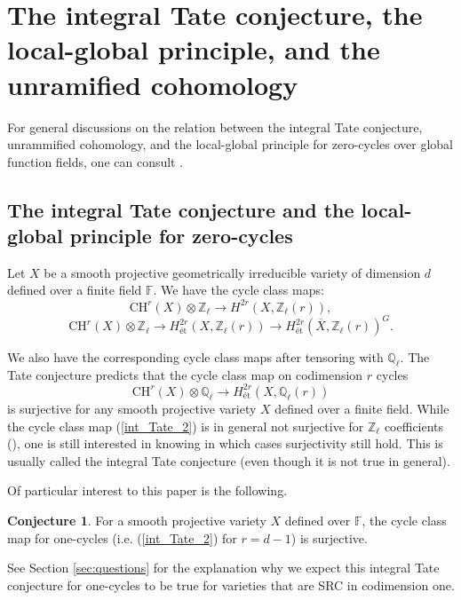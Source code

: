 \documentclass{amsart}
\theoremstyle{definition}
\newtheorem{conj}[theorem]{Conjecture}
\theoremstyle{remark}
\newcommand{\mbb}{\mathbb}
\newcommand{\FF}{\mbb{F}}
\newcommand{\QQ}{\mbb{Q}}
\newcommand{\ZZ}{\mbb{Z}}
\begin{document}

\section{The integral Tate conjecture, the local-global principle, and the unramified cohomology}\label{sec:ITateHasse}

For general discussions on the relation between the integral Tate conjecture, unrammified cohomology, and the local-global principle for zero-cycles over global function fields, one can consult \cite{CTKahnCycleCodim2,CT_Scavia_ITC}.
\subsection{The integral Tate conjecture and the local-global principle for zero-cycles}
Let $X$ be a smooth projective geometrically irreducible variety of dimension $d$ defined over a finite field $\FF$. We have the cycle class maps:
\begin{equation}\label{int_Tate_2}
\text{CH}^r(X) \otimes \ZZ_\ell \to H^{2r}(X, \ZZ_\ell(r)),
\end{equation}
\[
\text{CH}^r(X) \otimes \ZZ_\ell \to H^{2r}_{\text{{\'e}t}}(X, \ZZ_\ell(r)) \to H^{2r}_{\text{{\'e}t}}(\overline{X}, \ZZ_\ell(r))^G.
\]

We also have the corresponding cycle class maps after tensoring with $\QQ_\ell$.
The Tate conjecture predicts that the cycle class map on codimension $r$ cycles
\[
\text{CH}^r(X) \otimes \mathbb{Q}_\ell \to H^{2r}_{\text{\'et}}(X, \mathbb{Q}_\ell(r))
\]
is surjective for any smooth projective variety $X$ defined over a finite field.
While the cycle class map (\ref{int_Tate_2}) is in general not surjective for $\ZZ_\ell$ coefficients (\cite[Th\'eor\`eme 2.1]{CTSzamuelyIntegralTate}), one is still interested in knowing in which cases surjectivity still hold.
This is usually called the integral Tate conjecture (even though it is not true in general).

Of particular interest to this paper is the following.
\begin{conj}\label{q:SRCTate}
For a smooth projective variety $X$ defined over $\FF$,  the cycle class map for one-cycles (i.e. (\ref{int_Tate_2}) for $r=d-1$) is surjective.
\end{conj}

See Section \ref{sec:questions} for the explanation why we expect this integral Tate conjecture for one-cycles to be true for varieties that are SRC in codimension one.
\end{document}

